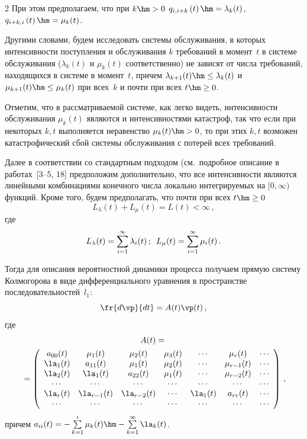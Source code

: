 \begin{multicols}{2}
При этом предполагаем, что при $k\hm>0$ $q_{i,i+k}\left( t\right)
\hm=\lambda_k(t)$, $q_{i+k,i}\left( t\right) \hm= \mu_k(t)$.

Другими словами, будем исследовать системы обслуживания, 
в которых интенсивности поступления и обслуживания $k$ требований в момент~$t$ 
в системе обслуживания ($\lambda_{k}(t)$ и  $\mu_{k}(t)$ соответственно)  
не зависят от числа требований, находящихся в системе в момент~$t$, 
причем $\lambda_{k+1}(t) \hm\le \lambda_{k}(t)$ и  $\mu_{k+1}(t) \hm\le \mu_{k}(t)$ при всех~$k$ 
и почти при всех $t \hm\ge 0$.

Отметим, что в рассматриваемой системе, как легко видеть,  
интенсивности обслуживания $\mu_{k}(t)$ являются и интенсивностями катастроф, 
так что если при некоторых $k,t$ выполняется неравенство $\mu_{k}(t) \hm> 0$, то при этих $k,t$ 
возможен катастрофический сбой системы обслуживания с потерей всех требований.

Далее в соответствии со стандартным подходом (см.\ подробное описание
в работах~[3--5, 18] предположим дополнительно, что
все интенсивности являются линейными комбинациями конечного числа
локально интегрируемых на $[0,\infty)$ функций. Кроме того, будем
предполагать, что  почти при всех $t\hm\ge 0$
\begin{equation*}
L_{\lambda}(t)+L_{\mu}(t) =L(t) < \infty\,,
\end{equation*}
 где 
 \begin{equation*}
L_{\lambda}(t)=\sum\limits_{i=1}^{\infty}\lambda_i(t)\,;\enskip  
L_{\mu}(t)=\sum\limits_{i=1}^{\infty}\mu_i(t)\,.
\end{equation*}

Тогда для описания вероятностной динамики процесса получаем прямую систему 
Колмогорова в виде дифференциального уравнения в пространстве последовательностей~$l_1$:
\begin{equation} 
\label{ur01}
\fr{d\vp}{dt}=A(t)\vp(t)\,,
\end{equation}
где
{\small %
\begin{multline*}
A(t)={}\\
{}=\left(
\begin{array}{cccccccc}
a_{00}(t) & \mu_1(t)  & \mu_2(t)   & \mu_3(t)  &  \cdots & \mu_r(t) & \cdots\\
\la_1(t)   & a_{11}(t)  & \mu_1(t)  & \mu_2(t)   &  \cdots & \mu_{r-1}(t) & \cdots\\
\la_2(t)  & \la_1(t)    & a_{22}(t)& \mu_1(t)  &   \cdots & \mu_{r-2}(t) & \cdots\\
\cdots &\cdots&\cdots&\cdots&\cdots&\cdots&\cdots\\
\la_r(t) & \la_{r-1}(t) & \la_{r-2}(t) & \cdots &  \la_1 (t)   &  a_{rr}(t) & \cdots\\
\cdots &\cdots&\cdots&\cdots&\cdots&\cdots&\cdots\\
\end{array}
\right)\,,
\end{multline*}
}
причем  $a_{ii}(t)=-\sum\limits_{k=1}^{i}\mu_k(t) \hm- \sum\limits_{k=1}^{\infty} \la_{k}(t)$.


\end{multicols}
